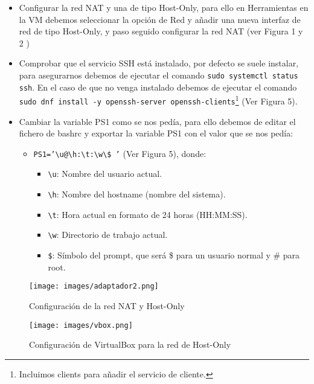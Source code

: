 \documentclass[a4paper,12pt]{article}
\begin{document}
\begin{itemize}
    \item Configurar la red NAT y una de tipo Host-Only, para ello en Herramientas en la VM debemos seleccionar la opción de Red y añadir una nueva interfaz de red de tipo Host-Only, y paso seguido configurar la red NAT (ver Figura 1 y 2 )
    \item Comprobar que el servicio SSH está instalado, por defecto se suele instalar, para asegurarnos debemos de ejecutar el comando \texttt{sudo systemctl status ssh}. En el caso de que no venga instalado debemos de ejecutar el comando \texttt{sudo dnf install -y openssh-server openssh-clients}\footnote{Incluimos clients para añadir el servicio de cliente.} (Ver Figura 5).
    \item Cambiar la variable PS1 como se nos pedía, para ello debemos de editar el fichero de bashrc y exportar la variable PS1 con el valor que se nos pedía:
    \begin{itemize}
        \item \texttt{PS1='\textbackslash u@\textbackslash h:\textbackslash t:\textbackslash w\textbackslash\$ '} (Ver Figura 5), donde:
        \begin{itemize}
            \item \texttt{\textbackslash u}: Nombre del usuario actual.
            \item \texttt{\textbackslash h}: Nombre del hostname (nombre del sistema).
            \item \texttt{\textbackslash t}: Hora actual en formato de 24 horas (HH:MM:SS).
            \item \texttt{\textbackslash w}: Directorio de trabajo actual.
            \item \texttt{\$}: Símbolo del prompt, que será \$ para un usuario normal y \# para root.
        \end{itemize}
    \end{itemize}
\end{itemize}

\begin{figure}[htbp]
    \centering
    \begin{minipage}[b]{0.45\textwidth}
        \centering
        \texttt{[image: images/adaptador2.png]}
        \caption{Configuración de la red NAT y Host-Only}
        \label{fig:ejercicio1}
    \end{minipage}
    \hfill
    \begin{minipage}[b]{0.45\textwidth}
        \centering
        \texttt{[image: images/vbox.png]}
        \caption{Configuración de VirtualBox para la red de Host-Only}
        \label{fig:ejercicio1_vbox}
    \end{minipage}
\end{figure}
\end{document}
